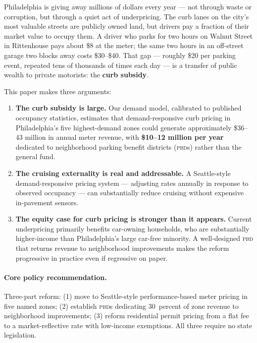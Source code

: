 \documentclass[11pt, letterpaper]{article}
\newcommand{\pbd}{\textsc{pbd}}
\begin{document}
Philadelphia is giving away millions of dollars every year --- not through waste
or corruption, but through a quiet act of underpricing. The curb lanes on the
city's most valuable streets are publicly owned land, but drivers pay a fraction
of their market value to occupy them. A driver who parks for two hours on Walnut
Street in Rittenhouse pays about \$8 at the meter; the same two hours in an
off-street garage two blocks away costs \$30--\$40. That gap --- roughly \$20
per parking event, repeated tens of thousands of times each day --- is a transfer
of public wealth to private motorists: the \textbf{curb subsidy}.

This paper makes three arguments:

\begin{enumerate}
  \item \textbf{The curb subsidy is large.} Our demand model, calibrated to
        published occupancy statistics, estimates that demand-responsive curb
        pricing in Philadelphia's five highest-demand zones could generate
        approximately \$36--43 million in annual meter revenue, with
        \textbf{\$10--12 million per year} dedicated to neighborhood
        parking benefit districts (\pbd{}s) rather than the general fund.

  \item \textbf{The cruising externality is real and addressable.} A
        Seattle-style demand-responsive pricing system --- adjusting rates
        annually in response to observed occupancy --- can substantially
        reduce cruising without expensive in-pavement sensors.

  \item \textbf{The equity case for curb pricing is stronger than it
        appears.} Current underpricing primarily benefits car-owning
        households, who are substantially higher-income than Philadelphia's
        large car-free minority. A well-designed \pbd{} that returns revenue
        to neighborhood improvements makes the reform progressive in practice
        even if regressive on paper.
\end{enumerate}

\paragraph{Core policy recommendation.}
Three-part reform: (1) move to Seattle-style performance-based meter
pricing in five named zones; (2) establish \pbd{}s dedicating 30~percent
of zone revenue to neighborhood improvements; (3) reform residential permit
pricing from a flat fee to a market-reflective rate with low-income
exemptions. All three require no state legislation.
\end{document}
